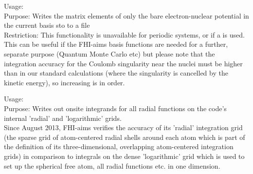 {
  \noindent
  Usage:   \\[1.0ex]
  Purpose: Writes the matrix elements of only the bare electron-nuclear
  potential in the current basis sto to a file
  \\[1.0ex]
  Restriction: This functionality is unavailable for periodic systems,
    or if a  is used. \\[1.0ex]
}
This can be useful if the FHI-aims basis functions are needed for a further,
  separate purpose (Quantum Monte Carlo etc) but please note that the
  integration accuracy for the Coulomb singularity near the nuclei must be
  higher than in our standard calculations (where the singularity is cancelled
  by the kinetic energy), so increasing
   is in order.

{
  \noindent
  Usage:   \\[1.0ex]
  Purpose: Writes out onsite integrands for all radial functions on
           the code's internal 'radial' and 'logarithmic' grids. \\[1.0ex]
}
Since August 2013, FHI-aims verifies the accuracy of its 'radial' integration
grid (the sparse grid of atom-centered radial shells around each atom which
is part of the definition of its three-dimensional, overlapping atom-centered
integration grids) in comparison to integrals on the dense 'logarithmic' grid
which is used to set up the spherical free atom, all radial functions etc. in
one dimension.


